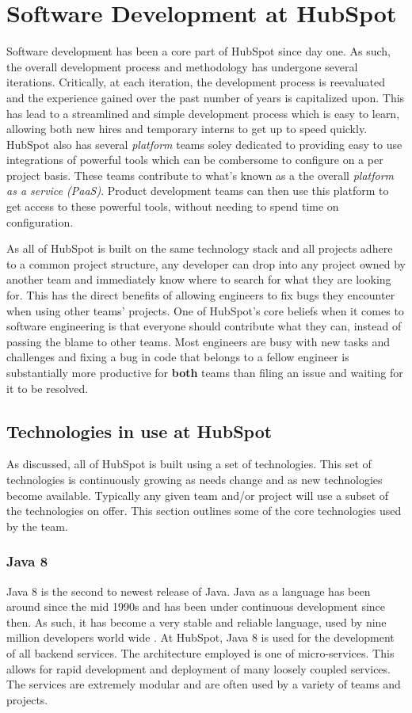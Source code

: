 \chapter{Software Development at HubSpot}
Software development has been a core part of HubSpot since day one. As such, the overall development process and methodology has undergone several iterations. Critically, at each iteration, the development process is reevaluated and the experience gained over the past number of years is capitalized upon. This has lead to a streamlined and simple development process which is easy to learn, allowing both new hires and temporary interns to get up to speed quickly. HubSpot also has several \textit{platform} teams soley dedicated to providing easy to use integrations of powerful tools which can be combersome to configure on a per project basis. These teams contribute to what's known as a the overall \textit{platform as a service (PaaS)}. Product development teams can then use this platform to get access to these powerful tools, without needing to spend time on configuration.

As all of HubSpot is built on the same technology stack and all projects adhere to a common project structure, any developer can drop into any project owned by another team and immediately know where to search for what they are looking for. This has the direct benefits of allowing engineers to fix bugs they encounter when using other teams' projects. One of HubSpot's core beliefs when it comes to software engineering is that everyone should contribute what they can, instead of passing the blame to other teams. Most engineers are busy with new tasks and challenges and fixing a bug in code that belongs to a fellow engineer is substantially more productive for \textbf{both} teams than filing an issue and waiting for it to be resolved. 

\section{Technologies in use at HubSpot}
As discussed, all of HubSpot is built using a set of technologies. This set of technologies is continuously growing as needs change and as new technologies become available. Typically any given team and/or project will use a subset of the technologies on offer. This section outlines some of the core technologies used by the \team{} team. 
\subsection{Java 8}
Java 8 is the second to newest release of Java. Java as a language has been around since the mid 1990s and has been under continuous development since then. As such, it has become a very stable and reliable language, used by nine million developers world wide \cite{java9Million}. At HubSpot, Java 8 is used for the development of all backend services. The architecture employed is one of micro-services. This allows for rapid development and deployment of many loosely coupled services. The services are extremely modular and are often used by a variety of teams and projects. 

